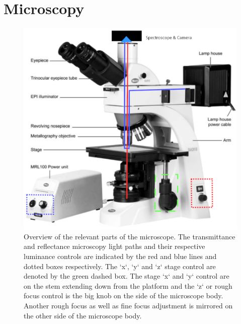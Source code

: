 \documentclass[a4paper]{scrartcl}
\begin{document}
\section*{Microscopy}
\begin{figure}[h]
	\begin{center}
		\includegraphics[width=.6\textwidth, keepaspectratio]{figures/illum_paths.png}
	\end{center}
	\caption{Overview of the relevant parts of the microscope. The transmittance and reflectance microscopy light paths and their respective luminance controls are indicated by the red and blue lines and dotted boxes respectively. The `x`, `y` and `z` stage control are denoted by the green dashed box. The stage `x` and `y` control are on the stem extending down from the platform and the `z` or rough focus control is the big knob on the side of the microscope body. Another rough focus as well as fine focus adjustment is mirrored on the other side of the microscope body.}
	\label{fig:illum_paths}
\end{figure}
\end{document}
